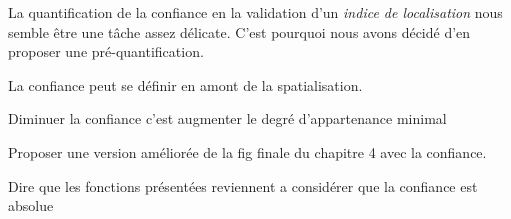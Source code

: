 

La quantification de la confiance en la validation d'un \emph{indice
  de localisation} nous semble être une tâche assez délicate. C'est
pourquoi nous avons décidé d'en proposer une pré-quantification.




La confiance peut se définir en amont de la spatialisation.

Diminuer la confiance c'est augmenter le degré d'appartenance minimal

Proposer une version améliorée de la fig finale du chapitre 4 avec la
confiance.

Dire que les fonctions présentées reviennent a considérer que la
confiance est absolue


